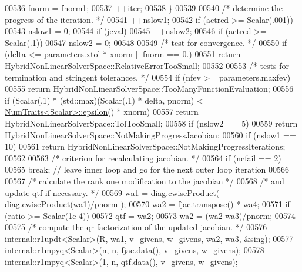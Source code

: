 \begin{DoxyCode}
00536             fnorm = fnorm1;
00537             ++iter;
00538         \}
00539 
00540         \textcolor{comment}{/* determine the progress of the iteration. */}
00541         ++nslow1;
00542         \textcolor{keywordflow}{if} (actred >= Scalar(.001))
00543             nslow1 = 0;
00544         \textcolor{keywordflow}{if} (jeval)
00545             ++nslow2;
00546         \textcolor{keywordflow}{if} (actred >= Scalar(.1))
00547             nslow2 = 0;
00548 
00549         \textcolor{comment}{/* test for convergence. */}
00550         \textcolor{keywordflow}{if} (delta <= parameters.xtol * xnorm || fnorm == 0.)
00551             \textcolor{keywordflow}{return} HybridNonLinearSolverSpace::RelativeErrorTooSmall;
00552 
00553         \textcolor{comment}{/* tests for termination and stringent tolerances. */}
00554         \textcolor{keywordflow}{if} (nfev >= parameters.maxfev)
00555             \textcolor{keywordflow}{return} HybridNonLinearSolverSpace::TooManyFunctionEvaluation;
00556         \textcolor{keywordflow}{if} (Scalar(.1) * (std::max)(Scalar(.1) * delta, pnorm) <= 
      \hyperlink{group___core___module_struct_eigen_1_1_num_traits}{NumTraits<Scalar>::epsilon}() * xnorm)
00557             \textcolor{keywordflow}{return} HybridNonLinearSolverSpace::TolTooSmall;
00558         \textcolor{keywordflow}{if} (nslow2 == 5)
00559             \textcolor{keywordflow}{return} HybridNonLinearSolverSpace::NotMakingProgressJacobian;
00560         \textcolor{keywordflow}{if} (nslow1 == 10)
00561             \textcolor{keywordflow}{return} HybridNonLinearSolverSpace::NotMakingProgressIterations;
00562 
00563         \textcolor{comment}{/* criterion for recalculating jacobian. */}
00564         \textcolor{keywordflow}{if} (ncfail == 2)
00565             \textcolor{keywordflow}{break}; \textcolor{comment}{// leave inner loop and go for the next outer loop iteration}
00566 
00567         \textcolor{comment}{/* calculate the rank one modification to the jacobian */}
00568         \textcolor{comment}{/* and update qtf if necessary. */}
00569         wa1 = diag.cwiseProduct( diag.cwiseProduct(wa1)/pnorm );
00570         wa2 = fjac.transpose() * wa4;
00571         \textcolor{keywordflow}{if} (ratio >= Scalar(1e-4))
00572             qtf = wa2;
00573         wa2 = (wa2-wa3)/pnorm;
00574 
00575         \textcolor{comment}{/* compute the qr factorization of the updated jacobian. */}
00576         internal::r1updt<Scalar>(R, wa1, v\_givens, w\_givens, wa2, wa3, &sing);
00577         internal::r1mpyq<Scalar>(n, n, fjac.data(), v\_givens, w\_givens);
00578         internal::r1mpyq<Scalar>(1, n, qtf.data(), v\_givens, w\_givens);

\end{DoxyCode}
